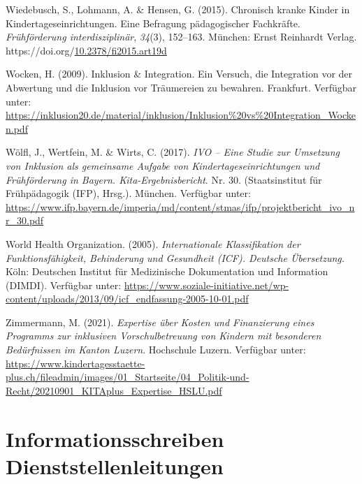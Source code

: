 \documentclass[
  ngerman,
  11pt,
  paper=a4,
  twoside,
  titlepage=true,
  openright,
  abstract=on,
  toc=listofnumbered,
  numbers=noenddot,
  chapterprefix=true,
  headings=optiontohead,
  svgnames,
  dvipsnames]{scrreprt}
\newlength{\cslhangindent}
\newlength{\cslentryspacingunit} %
\newenvironment{CSLReferences}[2] %
 {%
  \setlength{\parindent}{0pt}
  \ifodd #1
  \let\oldpar\par
  \def\par{\hangindent=\cslhangindent\oldpar}
  \fi
  \setlength{\parskip}{#2\cslentryspacingunit}
 }%
 {}
\begin{document}
\begin{CSLReferences}{1}{0}
\leavevmode{}%
Wiedebusch, S., Lohmann, A. \& Hensen, G. (2015). Chronisch kranke
Kinder in Kindertageseinrichtungen. Eine Befragung pädagogischer
Fachkräfte. \emph{Frühförderung interdisziplinär}, \emph{34}(3),
152–163. München: Ernst Reinhardt Verlag.
https://doi.org/\href{https://doi.org/10.2378/fi2015.art19d}{10.2378/fi2015.art19d}

\leavevmode{}%
Wocken, H. (2009). Inklusion \& Integration. Ein Versuch, die
Integration vor der Abwertung und die Inklusion vor Träumereien zu
bewahren. Frankfurt. Verfügbar unter:
\url{https://inklusion20.de/material/inklusion/Inklusion\%20vs\%20Integration_Wocken.pdf}

\leavevmode{}%
Wölfl, J., Wertfein, M. \& Wirts, C. (2017). \emph{IVO – Eine Studie zur
Umsetzung von Inklusion als gemeinsame Aufgabe von
Kindertageseinrichtungen und Frühförderung in Bayern.
Kita-Ergebnisbericht}. Nr. 30. (Staatsinstitut für Frühpädagogik (IFP),
Hrsg.). München. Verfügbar unter:
\url{https://www.ifp.bayern.de/imperia/md/content/stmas/ifp/projektbericht_ivo_nr_30.pdf}

\leavevmode{}%
World Health Organization. (2005). \emph{Internationale Klassifikation
der Funktionsfähigkeit, Behinderung und Gesundheit (ICF). Deutsche
Übersetzung.} Köln: Deutschen Institut für Medizinische Dokumentation
und Information (DIMDI). Verfügbar unter:
\url{https://www.soziale-initiative.net/wp-content/uploads/2013/09/icf_endfassung-2005-10-01.pdf}

\leavevmode{}%
Zimmermann, M. (2021). \emph{Expertise über Kosten und Finanzierung
eines Programms zur inklusiven Vorschulbetreuung von Kindern mit
besonderen Bedürfnissen im Kanton Luzern}. Hochschule Luzern. Verfügbar
unter:
\url{https://www.kindertagesstaette-plus.ch/fileadmin/images/01_Startseite/04_Politik-und-Recht/20210901_KITAplus_Expertise_HSLU.pdf}

\end{CSLReferences}

\listoffigures

\listoftables

\appendix
{}

\hypertarget{sec:informationsschreibenleitungen}{%
\chapter{Informationsschreiben
Dienststellenleitungen}\label{sec:informationsschreibenleitungen}}
\end{document}
